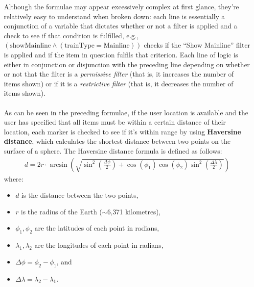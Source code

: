 \documentclass[a4paper,11pt]{report}
\begin{document}
Although the formulae may appear excessively complex at first glance, they're relatively easy to understand when broken down:
each line is essentially a conjunction of a variable that dictates whether or not a filter is applied and a check to see if that condition is fulfilled, e.g., $(\text{showMainline} \land (\text{trainType} = \text{Mainline}))$ checks if the ``Show Mainline'' filter is applied and if the item in question fulfils that criterion.
Each line of logic is either in conjunction or disjunction with the preceding line depending on whether or not that the filter is a \textit{permissive filter} (that is, it increases the number of items shown) or if it is a \textit{restrictive filter} (that is, it decreases the number of items shown).
\\\\
As can be seen in the preceding formulae, if the user location is available and the user has specified that all items must be within a certain distance of their location, each marker is checked to see if it's within range by using \textbf{Haversine distance}, which calculates the shortest distance between two points on the surface of a sphere.
The Haversine distance formula is defined as follows\supercite{chopde2013landmark}:
\begin{align*}
d = 2r \cdot \arcsin \left( \sqrt{ \sin^2 \left( \frac{\Delta \phi}{2} \right) + \cos \left( \phi_1 \right) \cos \left( \phi_2 \right) \sin^2 \left( \frac{\Delta \lambda}{2} \right) } \right)
\end{align*}
where:
\begin{itemize}
  \item   $d$ is the distance between the two points,
  \item   $r$ is the radius of the Earth ($\sim$6,371 kilometres\supercite{turcotte_earths_radius_1992}),
  \item   $\phi_1, \phi_2$ are the latitudes of each point in radians,
  \item   $\lambda_1, \lambda_2$ are the longitudes of each point in radians,
  \item   $\Delta \phi = \phi_2 - \phi_1$, and
  \item   $\Delta \lambda = \lambda_2 - \lambda_1$.
\end{itemize}
\end{document}
